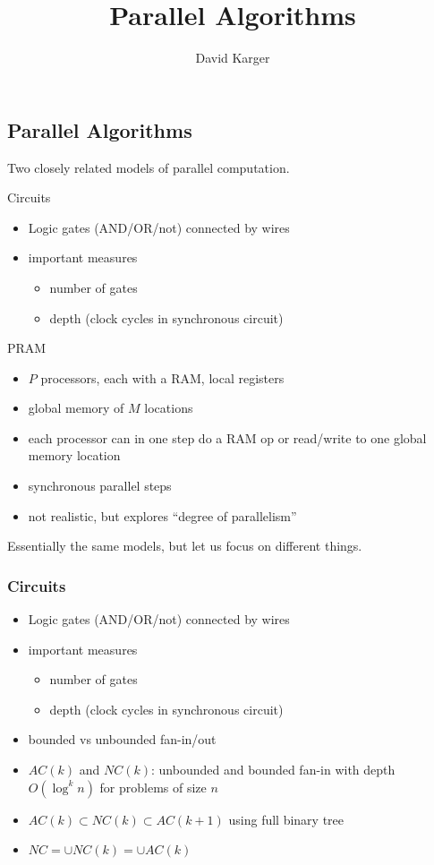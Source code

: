 \documentclass[12pt]{article}
\title{Parallel Algorithms}
\author{David Karger}
\begin{document}

\subsection*{Parallel Algorithms}

Two closely related models of parallel computation.

Circuits
\begin{itemize}
\item Logic gates (AND/OR/not) connected by wires
\item important measures
\begin{itemize}
\item number of gates
\item depth (clock cycles in synchronous circuit)
\end{itemize}
\end{itemize}

PRAM
\begin{itemize}
\item $P$ processors, each with a RAM, local registers
\item global memory of $M$ locations
\item each processor can in one step do a RAM op or read/write to one
  global memory location
\item synchronous parallel steps
\item not realistic, but explores ``degree of parallelism''
\end{itemize}

Essentially the same models, but let us focus on different things.

\subsubsection*{Circuits}

\begin{itemize}
\item Logic gates (AND/OR/not) connected by wires
\item important measures
\begin{itemize}
\item number of gates
\item depth (clock cycles in synchronous circuit)
\end{itemize}
\item bounded vs unbounded fan-in/out
\item $AC(k)$ and $NC(k)$: unbounded and bounded fan-in with depth
  $O(\log^k n)$ for problems of size $n$
\item $AC(k) \subset NC(k) \subset AC(k+1)$ using full binary tree
\item $NC=\cup NC(k)=\cup AC(k)$
\end{itemize}
\end{document}
